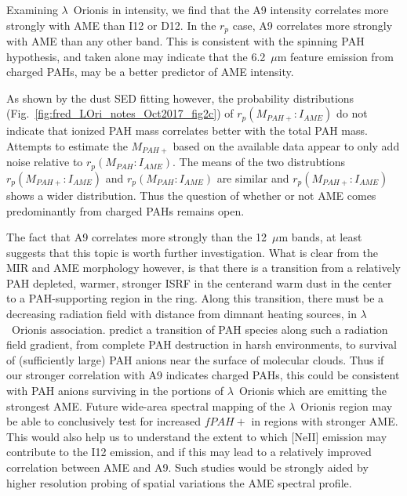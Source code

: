           Examining $\lambda$~Orionis in intensity, we find that the A9 intensity correlates more strongly with AME than I12 or D12. In the $r_{p}$ case, A9 correlates more strongly with AME than any other band. This is consistent with the spinning PAH hypothesis, and taken alone may indicate that the 6.2~$\mu$m feature emission from charged PAHs, may be a better predictor of AME intensity.

          As shown by the dust SED fitting however, the probability distributions (Fig.~\ref{fig:fred_LOri_notes_Oct2017_fig2c}) of $r_{p}(M_{PAH+}:I_{AME})$ do not indicate that ionized PAH mass correlates better with the total PAH mass. Attempts to estimate the $M_{PAH+}$ based on the available data appear to only add noise relative to $r_{p}(M_{PAH}:I_{AME})$. The means of the two distrubtions $r_{p}(M_{PAH+}:I_{AME})$  and $r_{p}(M_{PAH}:I_{AME})$ are similar and $r_{p}(M_{PAH+}:I_{AME})$ shows a wider distribution. Thus the question of whether or not AME comes predominantly from charged PAHs remains open.

          The fact that A9 correlates more strongly than the 12~$\mu$m bands, at least suggests that this topic is worth further investigation. What is clear from the MIR and AME morphology however, is that there is a transition from a relatively PAH depleted, warmer, stronger ISRF in the centerand warm dust in the center to a PAH-supporting region in the ring. Along this transition, there must be a decreasing radiation field with distance from dimnant heating sources, in $\lambda$~Orionis association. \cite{andrews16} predict a transition of PAH species along such a radiation field gradient, from complete PAH destruction in harsh environments, to survival of (sufficiently large) PAH anions near the surface of molecular clouds. Thus if our stronger correlation with A9 indicates charged PAHs, this could be consistent with PAH anions surviving in the portions of $\lambda$~Orionis which are emitting the strongest AME. Future wide-area spectral mapping of the $\lambda$~Orionis region may be able to conclusively test for increased $fPAH+$ in regions with stronger AME. This would also help us to understand the extent to which [NeII] emission may contribute to the I12 emission, and if this may lead to a relatively improved correlation between AME and A9. Such studies would be strongly aided by higher resolution probing of spatial variations the AME spectral profile.
